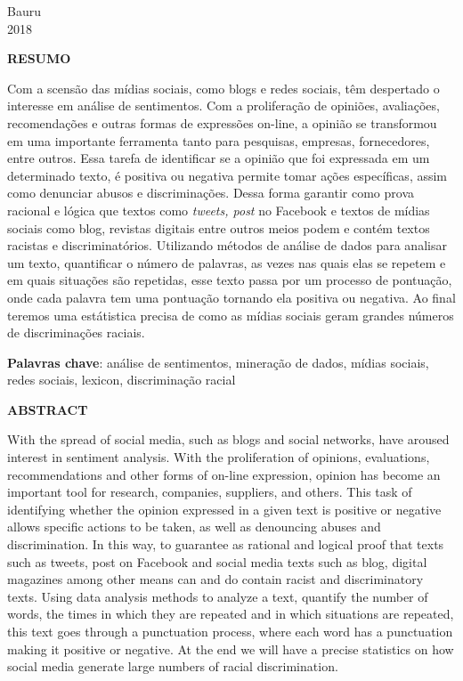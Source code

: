\documentclass[12pt, a4paper]{article}
\begin{document}
\vspace*{\fill}
\begin{center}
Bauru \\ 2018
\end{center}


\newpage

\thispagestyle{empty}
\vspace*{4.4cm}
{\begin{center}\textbf{\normalsize RESUMO}\vspace{36pt}\end{center}}
Com a scensão das mídias sociais, como blogs e redes sociais, têm despertado o interesse em análise de sentimentos. Com a proliferação de opiniões, avaliações, recomendações e outras formas de expressões on-line, a opinião se transformou em uma importante ferramenta tanto para pesquisas, empresas, fornecedores, entre outros. Essa tarefa de identificar se a opinião que foi expressada em um determinado texto, é positiva ou negativa permite tomar ações específicas, assim como denunciar abusos e discriminações. Dessa forma garantir como prova racional e lógica que textos como \textit{tweets, post} no Facebook e textos de mídias sociais como blog, revistas digitais entre outros meios podem e contém textos racistas e discriminatórios.
Utilizando métodos de análise de dados para analisar um texto, quantificar o número de palavras, as vezes nas quais elas se repetem e em quais situações são repetidas, esse texto passa por um processo de pontuação, onde cada palavra tem uma pontuação tornando ela positiva ou negativa. Ao final teremos uma estátistica precisa de como as mídias sociais geram grandes números de discriminações raciais.


\textbf{Palavras chave}: análise de sentimentos, mineração de dados, mídias sociais, redes sociais, lexicon, discriminação racial
\newpage
\thispagestyle{empty}
\vspace*{4.4cm}
{\begin{center}\textbf{\normalsize ABSTRACT}\vspace{36pt}\end{center}}
With the spread of social media, such as blogs and social networks, have aroused interest in sentiment analysis. With the proliferation of opinions, evaluations, recommendations and other forms of on-line expression, opinion has become an important tool for research, companies, suppliers, and others. This task of identifying whether the opinion expressed in a given text is positive or negative allows specific actions to be taken, as well as denouncing abuses and discrimination. In this way, to guarantee as rational and logical proof that texts such as tweets, post on Facebook and social media texts such as blog, digital magazines among other means can and do contain racist and discriminatory texts. Using data analysis methods to analyze a text, quantify the number of words, the times in which they are repeated and in which situations are repeated, this text goes through a punctuation process, where each word has a punctuation making it positive or negative. At the end we will have a precise statistics on how social media generate large numbers of racial discrimination.
\end{document}

